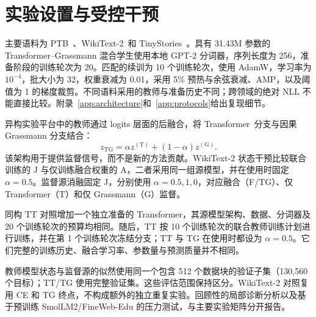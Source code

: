 \section{实验设置与受控干预}\label{sec:experimental-setting}

主要语料为 PTB~\citep{marcus1993ptb}、WikiText-2~\citep{merity2016wikitext}和 TinyStories~\citep{eldan2023tinystories}。具有 31.43M 参数的 Transformer--Grassmann 混合学生使用本地 GPT-2 分词器，序列长度为 256，准备阶段的训练轮次为 20。匹配的续训为 10 个训练轮次，使用 AdamW，学习率为 $10^{-4}$，批大小为 32，权重衰减为 0.01，采用 5\% 预热与余弦衰减、AMP，以及阈值为 1 的梯度裁剪。不同语料采用的教师与准备历史不同；跨领域的绝对 NLL 不能直接比较。附录~\ref{app:architecture}和~\ref{app:protocols}给出复现细节。

异构实验平台中的教师通过 logits 层面的后融合，将 Transformer~\citep{vaswani2017attention}分支与因果 Grassmann 分支结合：
\begin{equation}
z_{\mathrm{TG}}=\alpha z^{(\mathrm T)}+(1-\alpha)z^{(\mathrm G)}.
\label{eq:teacher-fusion}
\end{equation}
该架构用于提供监督信号，而不是新的方法贡献。WikiText-2 状态干预比较联合训练的 J 与仅训练融合权重的 A，二者采用同一组源模型，并在使用时固定 $\alpha=0.5$。监督源消融固定 J，分别使用 $\alpha=0.5,1,0$，对应融合（F/TG）、仅 Transformer（T）和仅 Grassmann（G）监督。

同构 TT 对照增加一个独立准备的 Transformer，其源模型架构、数据、分词器及 20 个训练轮次的预算均相同。随后，TT 按 10 个训练轮次的联合教师训练计划进行训练，并在第 1 个训练轮次冻结分支；TT 与 TG 在使用时都设为 $\alpha=0.5$。它们完整的训练历史、融合学习率、参数量与预测质量并不相同。

教师模型状态与监督源的似然使用同一个包含 512 个数据块的验证子集（130,560 个目标）；TT/TG 使用完整验证集。这些评估范围保持区分。WikiText-2 对照复用 CE 和 TG 终点，不构成额外的独立重复实验。回顾性的局部诊断分析以及基于预训练 SmolLM2/FineWeb-Edu 的压力测试，与主要实验矩阵分开报告。
